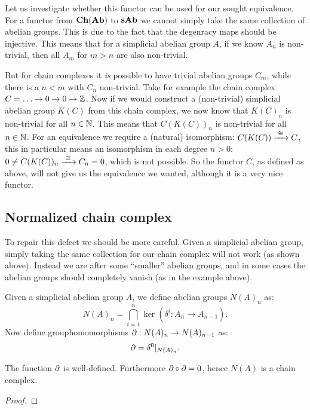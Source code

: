 Let us investigate whether this functor can be used for our sought equivalence. For a functor from $\mathbf{Ch}(\mathbf{Ab})$ to $\mathbf{sAb}$ we cannot simply take the same collection of abelian groups. This is due to the fact that the degenracy maps should be injective. This means that for a simplicial abelian group $A$, if we know $A_n$ is non-trivial, then all $A_m$ for $m > n$ are also non-trivial.

But for chain complexes it \emph{is} possible to have trivial abelian groups $C_m$, while there is a $n < m$ with $C_n$ non-trivial. Take for example the chain complex $ C = \ldots \to 0 \to 0 \to \mathbb{Z} $. Now if we would construct a (non-trivial) simplicial abelian group $K(C)$ from this chain complex, we now know that $K(C)_n$ is non-trivial for all $n \in \mathbb{N}$. This means that $C(K(C))_n$ is non-trivial for all $n \in \mathbb{N}$. For an equivalence we require a (natural) isomorphism: $C(K(C)) \xrightarrow{\,\,{\cong}\,\,} C$, this in particular means an isomorphism in each degree $n > 0$: $ 0 \neq C(K(C))_n \xrightarrow{\,\,{\cong}\,\,} C_n = 0 $, which is not possible. So the functor $C$, as defined as above, will not give us the equivalence we wanted, although it is a very nice functor.

\subsection{Normalized chain complex}
To repair this defect we should be more careful. Given a simplicial abelian group, simply taking the same collection for our chain complex will not work (as shown above). Instead we are after some ``smaller'' abelian groups, and in some cases the abelian groups should completely vanish (as in the example above).

Given a simplicial abelian group $A$, we define abelian groups $N(A)_n$ as:
$$ N(A)_n = \bigcap_{i=1}^{n} \ker(\delta^i : A_n \to A_{n-1}). $$
Now define grouphomomorphisms $\partial : N(A)_n \to N(A)_{n-1}$ as:
$$ \partial = \delta^0|_{N(A)_n}. $$
\begin{lemma}
	The function $ \partial $ is well-defined. Furthermore $ \partial \circ \partial = 0 $, hence $N(A)$ is a chain complex.
\end{lemma}
\begin{proof}
\end{proof}


